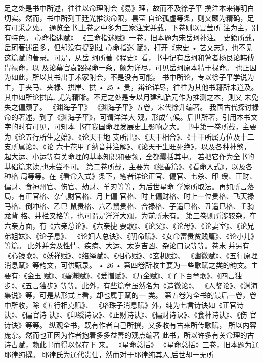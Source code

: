足之处是书中所述，往往以命理附会《易》理，故而不及徐子平
撰注本来得明白切实。然而，书中所列王廷光推演命限，昙莹
自论孤虚等条，则又颇为精确，足有可采之处。
通览全书,上卷之中多为三家注案并载，下卷则以昙莹所
注为主，别有特色。
心命指迷赋》
《三命指迷赋》一卷，旧本题为宋岳珂补注。
史籍所载，岳珂著述虽多，但却没有提到过 心命指迷
赋》，打开《宋史 • 艺文志》，也不见这篇赋的著录。可是，从岳
珂所著《程史》看，书中记有岳珂和瞽者杨艮论韩傅胄禄命，以
及论幕官袁韶禄命一条，颇为详尽，可见岳珂原本精于禄命。
也正因为如此，所以其书出于术家附会，不是没有可能。
书中所论，专以徐子平学说为主，于夹马、夹禄、拱岸、拱
• 25 •
贵，辩论详尽，往往为其他书籍所未道及。其中如所论拱库,
尤为精晰。不足之处是专以月建和胎元作为推测之本，则又
未免失之偏颇了。
《渊海子平》
《渊海子平》五卷，宋代徐升编著。
我国古代探讨禄命的著述，到了《渊海子平》，可谓洋洋大
观，形成气候。后世所著，引用本书文字的时有可见，可知本
书在我国命理发展史上影响之大。
书中第一卷所载，主要为《论五行所生之始》、《论天干地
支所出》、《天干相合》、《十干所属方位及十二支所属论》、《论
六十花甲子纳音并注解》、《论天干生旺死绝》，以及各种神煞，
起大运、小运等有关命理的基本知识和要领，全都囊括其中。
若把它作为全书的基础篇来读,也未尝不可。
第二卷所载，主要为《继善篇》、《看命入式》，以及各种格
局等等。在《看命入式》条下，笔者详论正官、偏官、七杀、印
绶、正财、偏财、食神州官、伤官、劫财、羊刃等等，为后世星命
学家所取法。再如所言落局，有正官格、杂气财官格、月上偏
官格、时上偏财格、时上一位贵格、飞天禄马格、倒冲格、乙巳
鼠贵格、六乙鼠贵格、合禄格、子遥巳格、丑遥巳格、壬骑龙背
格、井栏叉格等，也可谓是洋洋大观，为前所未有。
第三卷则所涉较杂，在六亲方面，有《六亲总论》、《六亲捷
要歌》、《论父》、《论母》、《论妻室》、《论兄弟姐妹》、《论子息》、
《论妇人总诀》、《阴命赋》、《女命富贵贫贱篇》、《论小儿》等篇。
此外并旁及性情、疾病、大运、太岁吉凶、杂论口诀等等。卷末
并另有《心镜歌》、《妖祥赋》、《络绎赋》、《相心赋》、《玄机赋》、
《幽微赋》、《五行原理消息赋》等韵文，可供甄录。
• 26 •
第四卷所收主要为一些歌赋之类的韵文。主要有:《金玉
赋》、《碧渊赋》、《爱憎赋》、《万金赋》、《子下百章歌》、《四言独
步》、《五言独步》等等。此外，有些篇章虽然名为《造微论》、
《人鉴论》、《渊海集说》等，可是从形式上看，却也属于赋的一
类。
第五卷为全书的最后一卷，卷中所收，除《五行相克赋》、
《珞珠子消息赋》外，纯为七言诗诀如《正官诗诀》、《偏官诗
诀》、《印绶诗诀》、《正财诗诀》、《偏财诗诀》、《食神诗诀》、《伤
官诗诀》等等。
纵观全书，既有作者自己所撰，又多收有古来所传歌赋，
所以内容庞杂。然而也正因为作者抱着多多益善的观点编著
此书，所以许多有关命理的古诗古赋，赖此书而得以保存下
来。
《星命总括》
《星命总括》三卷，旧本题为辽耶律纯撰。
耶律氏为辽代贵仕，然而对于耶律纯其人,后世却一无所
